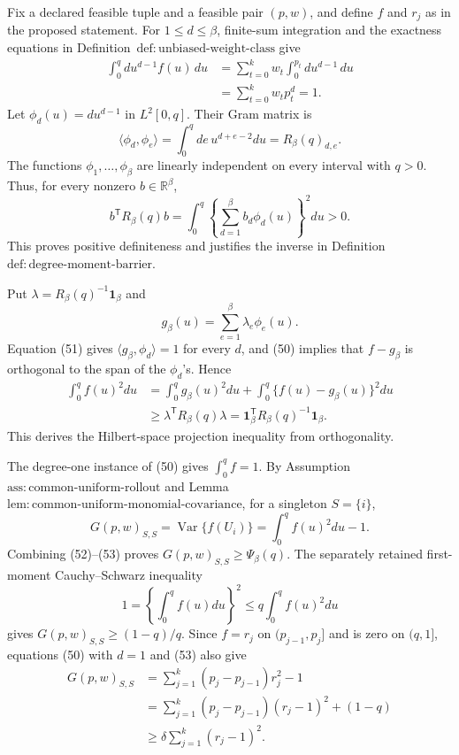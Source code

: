 Fix a declared feasible tuple and a feasible pair \((p,w)\), and define \(f\) and \(r_j\) as in the proposed statement.  For \(1\le d\le\beta\), finite-sum integration and the exactness equations in Definition~\(\mathrm{def{:}unbiased\text{-}weight\text{-}class}\) give
\[
\begin{aligned}
\int_0^q d u^{d-1}f(u)\,du
&=\sum_{t=0}^kw_t\int_0^{p_t}d u^{d-1}\,du\\
&=\sum_{t=0}^kw_tp_t^d=1.
\end{aligned}
\tag{50}
\]
Let \(\phi_d(u)=d u^{d-1}\) in \(L^2[0,q]\).  Their Gram matrix is
\[
\langle\phi_d,\phi_e\rangle
=\int_0^qde\,u^{d+e-2}du
=R_\beta(q)_{d,e}.
\tag{51}
\]
The functions \(\phi_1,\ldots,\phi_\beta\) are linearly independent on every interval with \(q>0\).  Thus, for every nonzero \(b\in\mathbb R^\beta\),
\[
b^{\mathsf T}R_\beta(q)b
=\int_0^q\left\{\sum_{d=1}^\beta b_d\phi_d(u)\right\}^2du>0.
\]
This proves positive definiteness and justifies the inverse in Definition~\(\mathrm{def{:}degree\text{-}moment\text{-}barrier}\).

Put \(\lambda=R_\beta(q)^{-1}\mathbf1_\beta\) and
\[
g_\beta(u)=\sum_{e=1}^\beta\lambda_e\phi_e(u).
\]
Equation (51) gives \(\langle g_\beta,\phi_d\rangle=1\) for every \(d\), and (50) implies that \(f-g_\beta\) is orthogonal to the span of the \(\phi_d\)'s.  Hence
\[
\begin{aligned}
\int_0^q f(u)^2du
&=\int_0^q g_\beta(u)^2du
+\int_0^q\{f(u)-g_\beta(u)\}^2du\\
&\ge\lambda^{\mathsf T}R_\beta(q)\lambda
=\mathbf1_\beta^{\mathsf T}R_\beta(q)^{-1}\mathbf1_\beta.
\end{aligned}
\tag{52}
\]
This derives the Hilbert-space projection inequality from orthogonality.

The degree-one instance of (50) gives \(\int_0^qf=1\).  By Assumption~\(\mathrm{ass{:}common\text{-}uniform\text{-}rollout}\) and Lemma~\(\mathrm{lem{:}common\text{-}uniform\text{-}monomial\text{-}covariance}\), for a singleton \(S=\{i\}\),
\[
G(p,w)_{S,S}
=\operatorname{Var}\{f(U_i)\}
=\int_0^qf(u)^2du-1.
\tag{53}
\]
Combining (52)--(53) proves \(G(p,w)_{S,S}\ge\Psi_\beta(q)\).  The separately retained first-moment Cauchy--Schwarz inequality
\[
1=\left\{\int_0^qf(u)du\right\}^2
\le q\int_0^qf(u)^2du
\tag{54}
\]
gives \(G(p,w)_{S,S}\ge(1-q)/q\).  Since \(f=r_j\) on \((p_{j-1},p_j]\) and is zero on \((q,1]\), equations (50) with \(d=1\) and (53) also give
\[
\begin{aligned}
G(p,w)_{S,S}
&=\sum_{j=1}^k(p_j-p_{j-1})r_j^2-1\\
&=\sum_{j=1}^k(p_j-p_{j-1})(r_j-1)^2+(1-q)\\
&\ge\delta\sum_{j=1}^k(r_j-1)^2.
\end{aligned}
\tag{55}
\]

